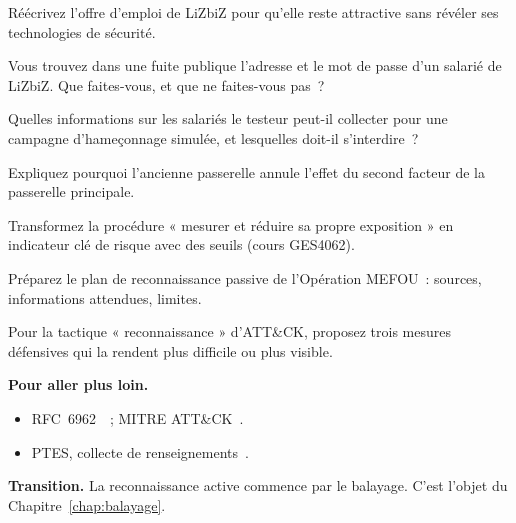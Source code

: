 \begin{boxexo}[title={\ding{45}\quad Exercice~5.4. L'offre d'emploi \niveaumoyen}]
Réécrivez l'offre d'emploi de LiZbiZ pour qu'elle reste attractive sans
révéler ses technologies de sécurité.
\end{boxexo}

\begin{boxexo}[title={\ding{45}\quad Exercice~5.5. Le compte publié \niveaumoyen}]
Vous trouvez dans une fuite publique l'adresse et le mot de passe d'un
salarié de LiZbiZ. Que faites-vous, et que ne faites-vous pas~?
\end{boxexo}

\begin{boxexo}[title={\ding{45}\quad Exercice~5.6. Les personnes \niveaumoyen}]
Quelles informations sur les salariés le testeur peut-il collecter pour une
campagne d'hameçonnage simulée, et lesquelles doit-il s'interdire~?
\end{boxexo}

\begin{boxexo}[title={\ding{45}\quad Exercice~5.7. T-03 \niveaumoyen}]
Expliquez pourquoi l'ancienne passerelle annule l'effet du second facteur
de la passerelle principale.
\end{boxexo}

\begin{boxexo}[title={\ding{45}\quad Exercice~5.8. La procédure \niveaumoyen}]
Transformez la procédure « mesurer et réduire sa propre exposition » en
indicateur clé de risque avec des seuils (cours GES4062).
\end{boxexo}

\begin{boxexo}[title={\ding{45}\quad Exercice~5.9. L'ANPP \niveauexpert}]
Préparez le plan de reconnaissance passive de l'Opération MEFOU~: sources,
informations attendues, limites.
\end{boxexo}

\begin{boxexo}[title={\ding{45}\quad Exercice~5.10. ATT\&CK \niveauexpert}]
Pour la tactique « reconnaissance » d'ATT\&CK, proposez trois mesures
défensives qui la rendent plus difficile ou plus visible.
\end{boxexo}

\bigskip

\begin{boxinfo}
\textbf{Pour aller plus loin.}
\begin{itemize}
    \item RFC~6962~\cite{rfc6962}~; MITRE ATT\&CK~\cite{mitreattack}.
    \item PTES, collecte de renseignements~\cite{ptes}.
\end{itemize}
\end{boxinfo}

\begin{boxinfo}
\textbf{Transition.} La reconnaissance active commence par le balayage.
C'est l'objet du Chapitre~\ref{chap:balayage}.
\end{boxinfo}
